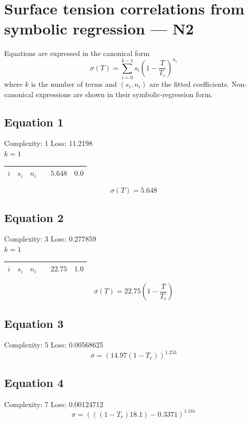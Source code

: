\documentclass[11pt]{article}
\begin{document}
\section*{Surface tension correlations from symbolic regression — N2}
\noindent Equations are expressed in the canonical form
\[
  \sigma(T) = \sum_{i=0}^{k-1} s_i \left(1 - \frac{T}{T_c}\right)^{\!n_i}
\]
where $k$ is the number of terms and $(s_i, n_i)$ are the fitted coefficients.
Non-canonical expressions are shown in their symbolic-regression form.

\subsection*{Equation 1}
\noindent Complexity: 1 \quad Loss: 11.2198 \\[4pt]
\noindent $k = 1$ \\[2pt]
\begin{center}
\begin{tabular}{ccc}
\toprule
$i$ & $s_i$ & $n_i$ \
 & $5.648$ & $0.0$ \\
\bottomrule
\end{tabular}
\end{center}
\[
\sigma(T) = 5.648
\]

\subsection*{Equation 2}
\noindent Complexity: 3 \quad Loss: 0.277859 \\[4pt]
\noindent $k = 1$ \\[2pt]
\begin{center}
\begin{tabular}{ccc}
\toprule
$i$ & $s_i$ & $n_i$ \
 & $22.75$ & $1.0$ \\
\bottomrule
\end{tabular}
\end{center}
\[
\sigma(T) = 22.75 \left(1 - \dfrac{T}{T_{\!c}}\right)
\]

\subsection*{Equation 3}
\noindent Complexity: 5 \quad Loss: 0.00568625 \\[4pt]
\[
\sigma = \left(14.97 (1 - T_r)\right)^{1.253}
\]

\subsection*{Equation 4}
\noindent Complexity: 7 \quad Loss: 0.00124712 \\[4pt]
\[
\sigma = \left(((1 - T_r) 18.1) - 0.3371\right)^{1.161}
\]
\end{document}
